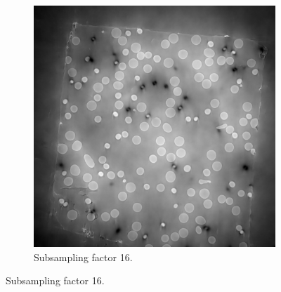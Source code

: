 \begin{figure}
\begin{subfigure}[t]{.45\textwidth}
    \includegraphics[width=\linewidth]{figures/ns16it100000itd4mse035logcosh3.png}
    \caption{Subsampling factor 16. }
  \end{subfigure}

  \medskip


\end{figure}
